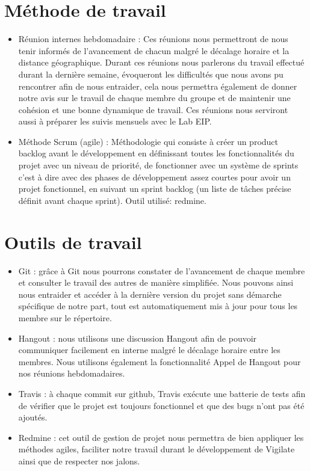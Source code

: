 \section{Méthode de travail}
\begin{itemize}
\item Réunion internes hebdomadaire : Ces réunions nous permettront de nous tenir informés de l’avancement de chacun malgré le décalage horaire et la distance géographique. Durant ces réunions nous parlerons du travail effectué durant la dernière semaine, évoqueront les difficultés que nous avons pu rencontrer afin de nous entraider, cela nous permettra également de donner notre avis sur le travail de chaque membre du groupe et de maintenir une cohésion et une bonne dynamique de travail. Ces réunions nous serviront aussi à préparer les suivis mensuels avec le Lab EIP.\\
\item Méthode Scrum (agile) : Méthodologie qui consiste à créer un product backlog avant le développement en définissant toutes les fonctionnalités du projet avec un niveau de priorité, de fonctionner avec un système de sprints c’est à dire avec des phases de développement assez courtes pour avoir un projet fonctionnel, en suivant un sprint backlog (un liste de tâches précise définit avant chaque sprint). Outil utilisé: redmine.\\
\end{itemize}
\section{Outils de travail}
\begin{itemize}
\item Git : grâce à Git nous pourrons constater de l’avancement de chaque membre et consulter le travail des autres de manière simplifiée. Nous pouvons ainsi nous entraider et accéder à la dernière version du projet sans démarche spécifique de notre part, tout est automatiquement mis à jour pour tous les membre sur le répertoire.\\
\item Hangout : nous utilisons une discussion Hangout afin de pouvoir communiquer facilement en interne malgré le décalage horaire entre les membres. Nous utilisons également la fonctionnalité Appel de Hangout pour nos réunions hebdomadaires.\\
\item Travis : à chaque commit sur github, Travis exécute une batterie de tests afin de vérifier que le projet est toujours fonctionnel et que des bugs n’ont pas été ajoutés.\\
\item Redmine : cet outil de gestion de projet nous permettra de bien appliquer les méthodes agiles, faciliter notre travail durant le développement de Vigilate ainsi que de respecter nos jalons.\\
\end{itemize}
